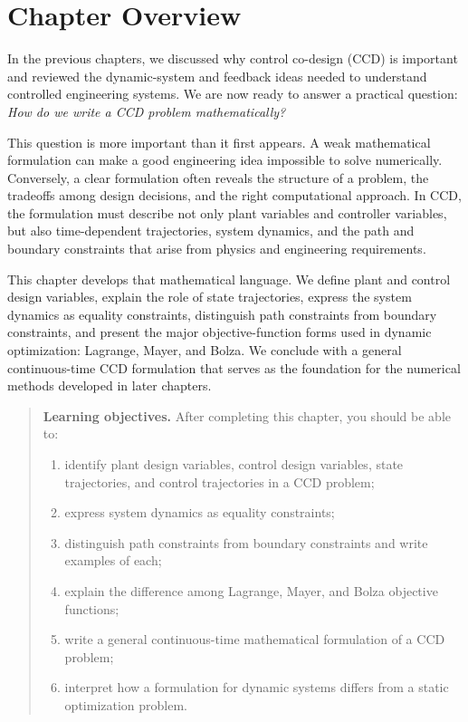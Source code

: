 \documentclass[11pt]{article}
\newenvironment{learningobjectives}{%
\begin{quote}\textbf{Learning objectives.} After completing this chapter, you should be able to:
\begin{enumerate}[leftmargin=1.4em,itemsep=0.35em,topsep=0.5em]
}{\end{enumerate}\end{quote}}
\begin{document}
\tableofcontents
\newpage

\section*{Chapter Overview}

In the previous chapters, we discussed why control co-design (CCD) is important and reviewed the dynamic-system and feedback ideas needed to understand controlled engineering systems. We are now ready to answer a practical question: \emph{How do we write a CCD problem mathematically?}

This question is more important than it first appears. A weak mathematical formulation can make a good engineering idea impossible to solve numerically. Conversely, a clear formulation often reveals the structure of a problem, the tradeoffs among design decisions, and the right computational approach. In CCD, the formulation must describe not only plant variables and controller variables, but also time-dependent trajectories, system dynamics, and the path and boundary constraints that arise from physics and engineering requirements.

This chapter develops that mathematical language. We define plant and control design variables, explain the role of state trajectories, express the system dynamics as equality constraints, distinguish path constraints from boundary constraints, and present the major objective-function forms used in dynamic optimization: Lagrange, Mayer, and Bolza. We conclude with a general continuous-time CCD formulation that serves as the foundation for the numerical methods developed in later chapters.

\begin{learningobjectives}
  \item identify plant design variables, control design variables, state trajectories, and control trajectories in a CCD problem;
  \item express system dynamics as equality constraints;
  \item distinguish path constraints from boundary constraints and write examples of each;
  \item explain the difference among Lagrange, Mayer, and Bolza objective functions;
  \item write a general continuous-time mathematical formulation of a CCD problem;
  \item interpret how a formulation for dynamic systems differs from a static optimization problem.
\end{learningobjectives}
\end{document}
